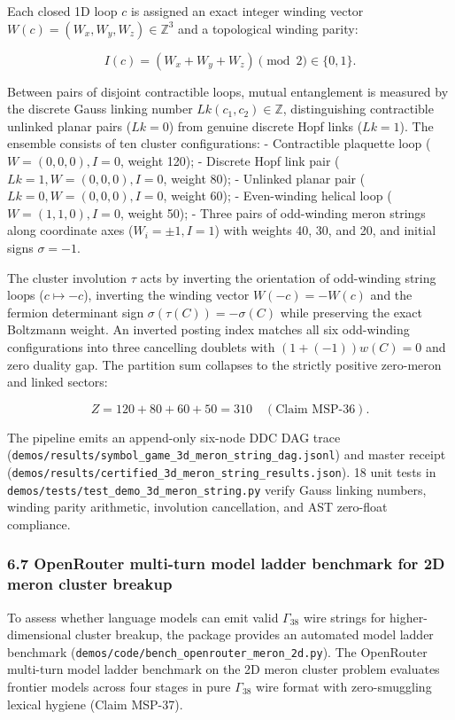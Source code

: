 \documentclass[
  11pt,
]{article}
\begin{document}
Each closed 1D loop \(c\) is assigned an exact integer winding vector
\(W(c) = (W_x,
W_y, W_z) \in \mathbb{Z}^3\) and a topological winding parity:

\[I(c) = (W_x + W_y + W_z) \pmod 2 \in \{0, 1\}.\]

Between pairs of disjoint contractible loops, mutual entanglement is
measured by the discrete Gauss linking number
\(Lk(c_1, c_2) \in \mathbb{Z}\), distinguishing contractible unlinked
planar pairs (\(Lk = 0\)) from genuine discrete Hopf links (\(Lk = 1\)).
The ensemble consists of ten cluster configurations: - Contractible
plaquette loop (\(W = (0, 0, 0), I = 0\), weight 120); - Discrete Hopf
link pair (\(Lk = 1, W = (0, 0, 0), I = 0\), weight 80); - Unlinked
planar pair (\(Lk = 0, W = (0, 0, 0), I = 0\), weight 60); -
Even-winding helical loop (\(W = (1, 1, 0), I = 0\), weight 50); - Three
pairs of odd-winding meron strings along coordinate axes (\(W_i = \pm 1,
  I = 1\)) with weights 40, 30, and 20, and initial signs
\(\sigma = -1\).

The cluster involution \(\tau\) acts by inverting the orientation of
odd-winding string loops (\(c \mapsto -c\)), inverting the winding
vector \(W(-c) = -W(c)\) and the fermion determinant sign
\(\sigma(\tau(C)) = -\sigma(C)\) while preserving the exact Boltzmann
weight. An inverted posting index matches all six odd-winding
configurations into three cancelling doublets with
\((1 + (-1)) w(C) = 0\) and zero duality gap. The partition sum
collapses to the strictly positive zero-meron and linked sectors:

\[Z = 120 + 80 + 60 + 50 = 310 \quad (\text{Claim MSP-36}).\]

The pipeline emits an append-only six-node DDC DAG trace
(\nolinkurl{demos/results/symbol_game_3d_meron_string_dag.jsonl}) and
master receipt
(\nolinkurl{demos/results/certified_3d_meron_string_results.json}). 18
unit tests in \nolinkurl{demos/tests/test_demo_3d_meron_string.py}
verify Gauss linking numbers, winding parity arithmetic, involution
cancellation, and AST zero-float compliance.

\subsubsection{6.7 OpenRouter multi-turn model ladder benchmark for 2D
meron cluster
breakup}\label{openrouter-multi-turn-model-ladder-benchmark-for-2d-meron-cluster-breakup}

To assess whether language models can emit valid \(\Gamma_{38}\) wire
strings for higher-dimensional cluster breakup, the package provides an
automated model ladder benchmark
(\nolinkurl{demos/code/bench_openrouter_meron_2d.py}). The OpenRouter
multi-turn model ladder benchmark on the 2D meron cluster problem
evaluates frontier models across four stages in pure \(\Gamma_{38}\)
wire format with zero-smuggling lexical hygiene (Claim MSP-37).
\end{document}

